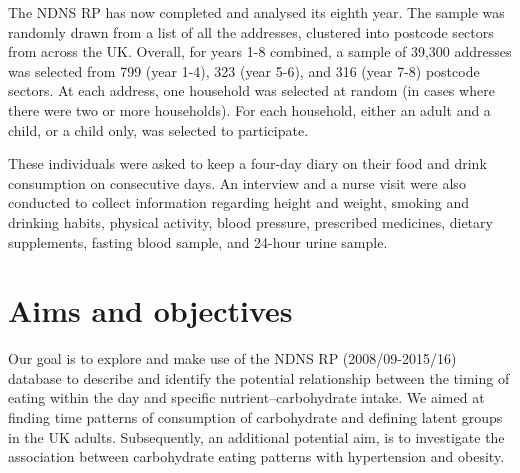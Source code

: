 The NDNS RP has now completed and analysed its eighth year. The sample was randomly drawn from a list of all the addresses, clustered into postcode sectors from across the UK. Overall, for years 1-8 combined, a sample of 39,300 addresses was selected from 799 (year 1-4), 323 (year 5-6), and 316 (year 7-8) postcode sectors. At each address, one household was selected at random (in cases where there were two or more households). For each household, either an adult and a child, or a child only, was selected to participate. 

These individuals were asked to keep a four-day diary on their food and drink consumption on consecutive days. An interview and a nurse visit were also conducted to collect information regarding height and weight, smoking and drinking habits, physical activity, blood pressure, prescribed medicines, dietary supplements, fasting blood sample, and 24-hour urine sample. \vspace{-0.3cm}

\section{Aims and objectives}\vspace{-0.3cm}


Our goal is to explore and make use of the NDNS RP (2008/09-2015/16) database to describe and identify the potential relationship between the timing of eating within the day and specific nutrient--carbohydrate intake. We aimed at finding time patterns of consumption of carbohydrate and defining latent groups in the UK adults. Subsequently, an additional potential aim, is to investigate the association between carbohydrate eating patterns with hypertension and obesity.

